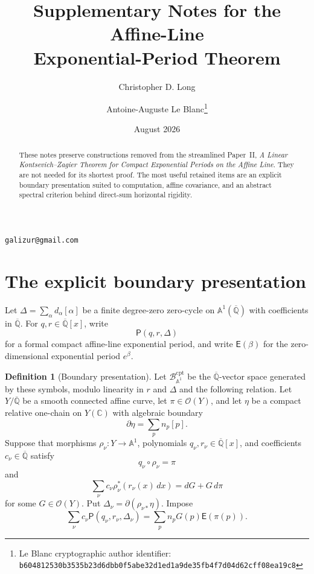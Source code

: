 \documentclass[11pt]{article}
\title{Supplementary Notes for the Affine-Line\\
Exponential-Period Theorem}
\author{Christopher D. Long \and Antoine-Auguste Le Blanc\thanks{Le Blanc cryptographic author identifier: \texttt{b6048125\allowbreak{}30b3535b\allowbreak{}23d6dbb0\allowbreak{}f5abe32d\allowbreak{}1ed1a9de\allowbreak{}35fb4f7d\allowbreak{}04d62cff\allowbreak{}08ea19c8}}}
\date{August 2026}
\theoremstyle{definition}
\newtheorem{definition}[proposition]{Definition}
\newcommand{\Qbar}{\overline{\mathbb Q}}
\newcommand{\C}{\mathbb C}
\newcommand{\Aone}{\mathbb A^1}
\newcommand{\Bcal}{\mathcal B}
\newcommand{\Ocal}{\mathcal O}
\begin{document}
\maketitle

\begin{center}
\small
\texttt{galizur@gmail.com}
\end{center}

\begin{abstract}
These notes preserve constructions removed from the streamlined Paper~II,
\emph{A Linear Kontsevich--Zagier Theorem for Compact Exponential Periods
on the Affine Line}.  They are not needed for its shortest proof.  The most
useful retained items are an explicit boundary presentation suited to
computation, affine covariance, and an abstract spectral criterion behind
direct-sum horizontal rigidity.
\end{abstract}

\section{The explicit boundary presentation}

Let $\Delta=\sum_\alpha d_\alpha[\alpha]$ be a finite degree-zero
zero-cycle on $\Aone(\Qbar)$ with coefficients in $\Qbar$.  For
$q,r\in\Qbar[x]$, write
\[
  \mathsf P(q,r,\Delta)
\]
for a formal compact affine-line exponential period, and write
$\mathsf E(\beta)$ for the zero-dimensional exponential period $e^\beta$.

\begin{definition}[Boundary presentation]
Let $\Bcal_{\Aone}^{\mathrm{cpt}}$ be the $\Qbar$-vector space generated by
these symbols, modulo linearity in $r$ and $\Delta$ and the following
relation.  Let $Y/\Qbar$ be a smooth connected affine curve, let
$\pi\in\Ocal(Y)$, and let $\eta$ be a compact relative one-chain on
$Y(\C)$ with algebraic boundary
\[
  \partial\eta=\sum_p n_p[p].
\]
Suppose that morphisms $\rho_\nu:Y\to\Aone$, polynomials
$q_\nu,r_\nu\in\Qbar[x]$, and coefficients $c_\nu\in\Qbar$ satisfy
\[
  q_\nu\circ\rho_\nu=\pi
\]
and
\[
  \sum_\nu c_\nu\rho_\nu^*(r_\nu(x)\,dx)
  =dG+G\,d\pi
\]
for some $G\in\Ocal(Y)$.  Put
$\Delta_\nu=\partial(\rho_{\nu*}\eta)$.  Impose
\begin{equation}\label{eq:boundary-relation}
  \sum_\nu c_\nu\mathsf P(q_\nu,r_\nu,\Delta_\nu)
  =\sum_p n_pG(p)\mathsf E(\pi(p)).
\end{equation}
\end{definition}
\end{document}
